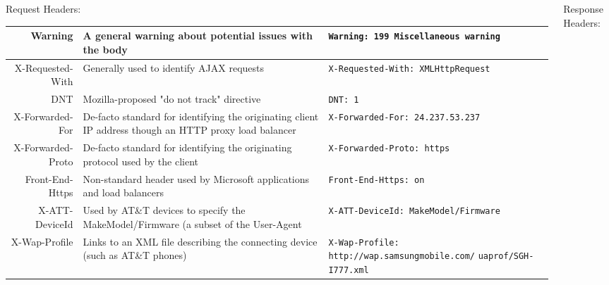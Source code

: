 \documentclass[final]{beamer}
\newcommand{\header}[1]{\texttt{\lstinline!#1!}}
\begin{document}
\begin{frame}{}
\begin{columns}
\begin{column}{0.4\textwidth}
\begin{block}{\huge{Request Headers:}}
\begin{tabular}{r p{} p{}}
            Warning & A general warning about potential issues with the body & \header{Warning: 199 Miscellaneous warning } \\ \hline
            X-Requested-With & Generally used to identify AJAX requests & \header{X-Requested-With: XMLHttpRequest } \\
            DNT & Mozilla-proposed "do not track" directive & \header{DNT: 1 } \\
            X-Forwarded-For & De-facto standard for identifying the originating client IP address though an HTTP proxy load balancer & \header{X-Forwarded-For: 24.237.53.237 } \\
            X-Forwarded-Proto & De-facto standard for identifying the originating protocol used by the client & \header{X-Forwarded-Proto: https } \\
            Front-End-Https & Non-standard header used by Microsoft applications and load balancers & \header{Front-End-Https: on } \\
            X-ATT-DeviceId & Used by AT\&T devices to specify the MakeModel/Firmware (a subset of the User-Agent & \header{X-ATT-DeviceId: MakeModel/Firmware } \\ %
            X-Wap-Profile & Links to an XML file describing the connecting device (such as AT\&T phones) & \header{X-Wap-Profile: http://wap.samsungmobile.com/} \header{uaprof/SGH-I777.xml} \\
          \end{tabular}

          \vspace{1.1in}

        \end{block}
      \end{column}
      \begin{column}{0.4\textwidth}
        \begin{block}{\huge{Response Headers:}}

          \vspace{0.3in}


\end{block}
\end{column}
\end{columns}
\end{frame}
\end{document}
